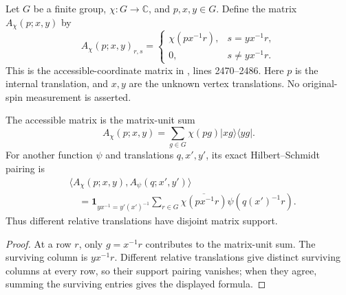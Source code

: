 \begin{definition}
    \label{def:peps_regular_charge_coordinates}
    \leanok
    Let $G$ be a finite group, $\chi:G\to\mathbb C$, and $p,x,y\in G$.
    Define the matrix $A_\chi(p;x,y)$ by
    \[
        A_\chi(p;x,y)_{r,s}
        =\begin{cases}
            \chi(px^{-1}r), & s=yx^{-1}r,    \\
            0,              & s\ne yx^{-1}r.
        \end{cases}
    \]
    This is the accessible-coordinate matrix in
    \cite[charge-detection proof]{Schuch2010PEPS}, lines 2470--2486.
    Here $p$ is the internal translation, and $x,y$ are the unknown vertex
    translations. No original-spin measurement is asserted.
\end{definition}

\begin{lemma}
    \label{thm:peps_regular_charge_coordinates_pairing}
    \leanok
    The accessible matrix is the matrix-unit sum
    \[
        A_\chi(p;x,y)
        =\sum_{g\in G}\chi(pg)|xg\rangle\langle yg|.
    \]
    For another function $\psi$ and translations $q,x',y'$, its exact
    Hilbert--Schmidt pairing is
    \begin{align}
         & \langle A_\chi(p;x,y),A_\psi(q;x',y')\rangle \\
         & \quad=\mathbf1_{yx^{-1}=y'(x')^{-1}}
        \sum_{r\in G}\overline{\chi(px^{-1}r)}\psi(q(x')^{-1}r).
    \end{align}
    Thus different relative translations have disjoint matrix support.
\end{lemma}
\begin{proof}\leanok
    At a row $r$, only $g=x^{-1}r$ contributes to the matrix-unit sum.
    The surviving column is $yx^{-1}r$. Different relative translations
    give distinct surviving columns at every row, so their support pairing
    vanishes; when they agree, summing the surviving entries gives the
    displayed formula.
\end{proof}

